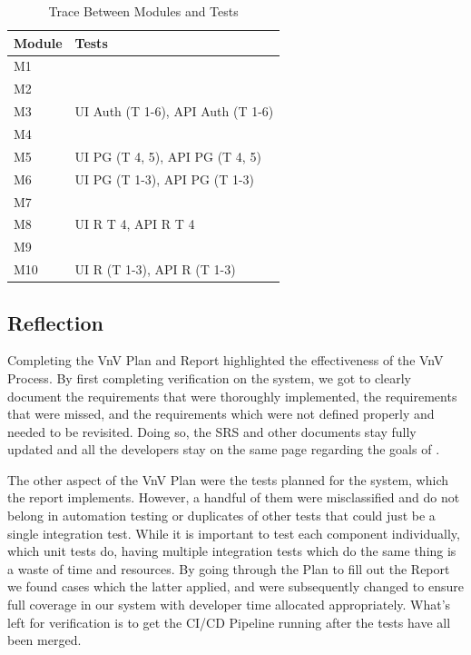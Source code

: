 \documentclass[12pt, titlepage]{article}
\begin{document}
\begin{table}[H]
	\caption{Trace Between Modules and Tests}
	\centering
	\begin{tabular}{p{} p{}}
		\toprule
		\textbf{Module} & \textbf{Tests}\\
		\midrule
		M1 & \\
		M2 & \\
		M3 & UI Auth (T 1-6), API Auth (T 1-6) \\
		M4 & \\
		M5 & UI PG (T 4, 5), API PG (T 4, 5)\\
		M6 & UI PG (T 1-3), API PG (T 1-3)\\
		M7 & \\
		M8 & UI R T 4, API R T 4\\
		M9 & \\
		M10 & UI R (T 1-3), API R (T 1-3)\\
		\bottomrule
	\end{tabular}
	
	\label{TblRT}
\end{table}

\subsection*{Reflection}
Completing the VnV Plan and Report highlighted the effectiveness of the VnV Process. By first completing verification on the system, we got to clearly document the requirements that were thoroughly implemented, the requirements that were missed, and the requirements which were not defined properly and needed to be revisited. Doing so, the SRS and other documents stay fully updated and all the developers stay on the same page regarding the goals of \progname . 

\noindent The other aspect of the VnV Plan were the tests planned for the system, which the report implements. However, a handful of them were misclassified and do not belong in automation testing or duplicates of other tests that could just be a single integration test. While it is important to test each component individually, which unit tests do, having multiple integration tests which do the same thing is a waste of time and resources. By going through the Plan to fill out the Report we found cases which the latter applied, and were subsequently changed to ensure full coverage in our system with developer time allocated appropriately. What's left for verification is to get the CI/CD Pipeline running after the tests have all been merged.




\citet{VnVPlan} \\
\citet{SRS} \\
\citet{MG} \\
\citet{MIS} \\
\end{document}
